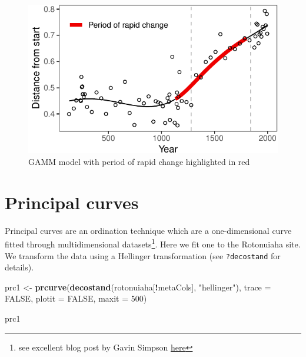 \documentclass[nofonts,]{tufte-handout}
\newenvironment{Shaded}{\begin{snugshade}}{\end{snugshade}}
\newcommand{\AttributeTok}[1]{\textcolor[rgb]{0.13,0.29,0.53}{#1}}
\newcommand{\ConstantTok}[1]{\textcolor[rgb]{0.56,0.35,0.01}{#1}}
\newcommand{\DecValTok}[1]{\textcolor[rgb]{0.00,0.00,0.81}{#1}}
\newcommand{\FunctionTok}[1]{\textcolor[rgb]{0.13,0.29,0.53}{\textbf{#1}}}
\newcommand{\NormalTok}[1]{#1}
\newcommand{\OtherTok}[1]{\textcolor[rgb]{0.56,0.35,0.01}{#1}}
\newcommand{\SpecialCharTok}[1]{\textcolor[rgb]{0.81,0.36,0.00}{\textbf{#1}}}
\newcommand{\StringTok}[1]{\textcolor[rgb]{0.31,0.60,0.02}{#1}}
\begin{document}
\begin{figure}
\includegraphics{Technical-supplement_files/figure-latex/distStartRates-1} \caption[GAMM model with period of rapid change highlighted in red]{GAMM model with period of rapid change highlighted in red}\label{fig:distStartRates}
\end{figure}

\hypertarget{principal-curves}{%
\section{Principal curves}\label{principal-curves}}

Principal curves are an ordination technique which are a one-dimensional
curve fitted through multidimensional datasets\footnote{see excellent
  blog post by Gavin Simpson
  \href{https://www.fromthebottomoftheheap.net/2014/01/09/pcurve-part-2/}{here}}.
Here we fit one to the Rotonuiaha site. We transform the data using a
Hellinger transformation (see \texttt{?decostand} for details).

\begin{Shaded}
\begin{Highlighting}[]
\NormalTok{prc1 }\OtherTok{\textless{}{-}} \FunctionTok{prcurve}\NormalTok{(}\FunctionTok{decostand}\NormalTok{(rotonuiaha[}\SpecialCharTok{!}\NormalTok{metaCols], }
                          \StringTok{"hellinger"}\NormalTok{), }
                \AttributeTok{trace =} \ConstantTok{FALSE}\NormalTok{, }\AttributeTok{plotit =} \ConstantTok{FALSE}\NormalTok{,  }
                \AttributeTok{maxit =} \DecValTok{500}\NormalTok{)}

\NormalTok{prc1}
\end{Highlighting}
\end{Shaded}
\end{document}
